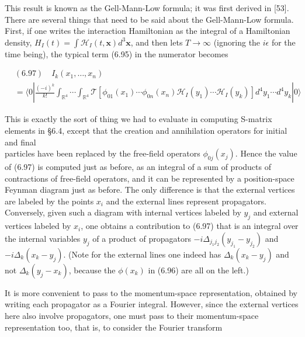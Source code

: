 \documentclass[10pt, letterpaper]{article}
\begin{document}
This result is known as the Gell-Mann-Low formula; it was first derived in [53].\\
There are several things that need to be said about the Gell-Mann-Low formula. First, if one writes the interaction Hamiltonian as the integral of a Hamiltonian density, $H_{I}(t)=\int \mathcal{H}_{I}(t, \mathbf{x}) d^{3} \mathbf{x}$, and then lets $T \rightarrow \infty$ (ignoring the $i \epsilon$ for the time being), the typical term (6.95) in the numerator becomes

$$
\begin{aligned}
& (6.97) \quad I_{k}\left(x_{1}, \ldots, x_{n}\right) \\
& =\langle 0| \frac{(-i)^{k}}{k!} \int_{\mathbb{R}^{4}} \cdots \int_{\mathbb{R}^{4}} \mathcal{T}\left[\phi_{01}\left(x_{1}\right) \cdots \phi_{0 n}\left(x_{n}\right) \mathcal{H}_{I}\left(y_{1}\right) \cdots \mathcal{H}_{I}\left(y_{k}\right)\right] d^{4} y_{1} \cdots d^{4} y_{k}|0\rangle
\end{aligned}
$$

This is exactly the sort of thing we had to evaluate in computing S-matrix elements in §6.4, except that the creation and annihilation operators for initial and final\\
particles have been replaced by the free-field operators $\phi_{0 j}\left(x_{j}\right)$. Hence the value of (6.97) is computed just as before, as an integral of a sum of products of contractions of free-field operators, and it can be represented by a position-space Feynman diagram just as before. The only difference is that the external vertices are labeled by the points $x_{i}$ and the external lines represent propagators. Conversely, given such a diagram with internal vertices labeled by $y_{j}$ and external vertices labeled by $x_{i}$, one obtains a contribution to (6.97) that is an integral over the internal variables $y_{j}$ of a product of propagators $-i \Delta_{j_{1} j_{2}}\left(y_{j_{1}}-y_{j_{2}}\right)$ and $-i \Delta_{k}\left(x_{k}-y_{j}\right)$. (Note for the external lines one indeed has $\Delta_{k}\left(x_{k}-y_{j}\right)$ and not $\Delta_{k}\left(y_{j}-x_{k}\right)$, because the $\phi\left(x_{k}\right)$ in (6.96) are all on the left.)

It is more convenient to pass to the momentum-space representation, obtained by writing each propagator as a Fourier integral. However, since the external vertices here also involve propagators, one must pass to their momentum-space representation too, that is, to consider the Fourier transform
\end{document}
